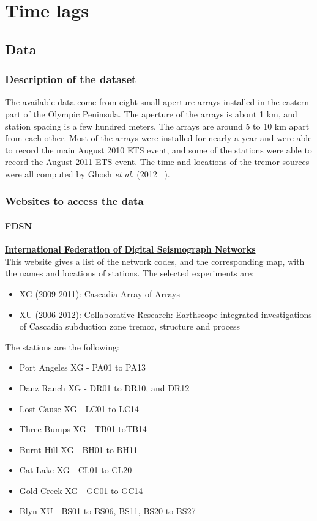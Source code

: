 \documentclass[main.tex]{subfiles}
\begin{document}
\part{Time lags}

\chapter{Data}

\section{Description of the dataset}

The available data come from eight small-aperture arrays installed in the eastern part of the Olympic Peninsula. The aperture of the arrays is about 1 km, and station spacing is a few hundred meters. The arrays are around 5 to 10 km apart from each other. Most of the arrays were installed for nearly a year and were able to record the main August 2010 ETS event, and some of the stations were able to record the August 2011 ETS event. The time and locations of the tremor sources were all computed by Ghosh \textit{et al.} (2012 ~\cite{GHO_2012}).

\section{Websites to access the data}

\subsection{FDSN}

\href{http://www.fdsn.org/networks/}{\textbf{International Federation of Digital Seismograph Networks}} \\

This website gives a list of the network codes, and the corresponding map, with the names and locations of stations. The selected experiments are:
\begin{itemize}
	\item XG (2009-2011): Cascadia Array of Arrays
	\item XU (2006-2012): Collaborative Research: Earthscope integrated investigations of Cascadia subduction zone tremor, structure and process
\end{itemize}

The stations are the following:
\begin{itemize}
	\item Port Angeles XG - PA01 to PA13
	\item Danz Ranch XG - DR01 to DR10, and DR12
	\item Lost Cause XG - LC01 to LC14
	\item Three Bumps XG - TB01 toTB14
	\item Burnt Hill XG - BH01 to BH11
	\item Cat Lake XG - CL01 to CL20
	\item Gold Creek XG - GC01 to GC14
	\item Blyn XU - BS01 to BS06, BS11, BS20 to BS27
\end{itemize}
\end{document}

